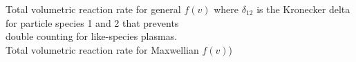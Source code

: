 \noindent
Total volumetric reaction rate for general $f(v)$ 
\indent where $\delta_{12}$ is the Kronecker delta for particle species 1 and 2 that prevents \\
\indent double counting for like-species plasmas.\\

\noindent
Total volumetric reaction rate for Maxwellian $f(v)$)   


\vfill

\pagebreak
